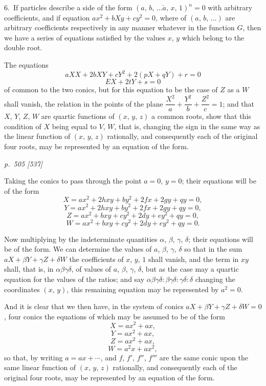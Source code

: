 \documentclass[11pt,a4paper]{book}
\begin{document}
\smallskip
\noindent\textsc{6.}\, If particles describe a side of the form $(a,\, b,\, \ldots\check{a},\, x,\, 1)^n = 0$ with arbitrary
coefficients, and if equation $a x^2 + bX y + c y^2 = 0$, where of $(a,\, b,\, \ldots)$ are arbitrary
coefficients respectively in any manner whatever in the function $G$, then we have a
series of equations satisfied by the values $x$, $y$ which belong to the double root.

The equations
\[
aXX + 2bXY + cY^2 + 2(pX + qY) + r = 0
\]
\[
EX + 2tY + s = 0
\]
of common to the two conics, but for this equation to be the case of $Z$ as a $W$ shall vanish, the relation
in the points of the plane $\dfrac{X^2}{a} + \dfrac{Y^2}{b} + \dfrac{Z^2}{c} = 1$; and that
$X$, $Y$, $Z$, $W$ are quartic functions of $(x,\, y,\, z)$ a common roots, show that this
condition of $X$ being equal to $V$, $W$, that is, changing the sign in the same way as the
linear function of $(x,\, y,\, z)$ rationally, and consequently each of the original four roots, may
be represented by an equation of the form.

\clearpage

\bigskip
\textit{p.~505 [537]}
\smallskip

\noindent
Taking the conics to pass through the point $a = 0$, $y = 0$; their equations will be
of the form
\[
X = ax^2 + 2hxy + by^2 + 2fx + 2gy + qy = 0,
\]
\[
Y = ax^2 + 2hxy + by^2 + 2fx + 2gy + qy = 0,
\]
\[
Z = ax^2 + bxy + cy^2 + 2dy + ey^2 + qy = 0,
\]
\[
W = ax^2 + bxy + cy^2 + 2dy + ey^2 + qy = 0.
\]

Now multiplying by the indeterminate quantities $\alpha$, $\beta$, $\gamma$, $\delta$; their equations will be
of the form. We can determine the values of $a$, $\beta$, $\gamma$, $\delta$ so that in the sum $aX + \beta Y + \gamma Z + \delta W$
the coefficients of $x$, $y$, $1$ shall vanish, and the term in $xy$ shall, that is, in $\alpha\beta\gamma\delta$,
of values of $a$, $\beta$, $\gamma$, $\delta$, but as the case may a quartic equation for the values of the ratios; and
say $\alpha\beta\gamma\delta : \beta\gamma\delta : \gamma\delta : \delta$ changing the coordinates $(x,\, y)$, this remaining equation
may be represented by $a^2 = 0$.

And it is clear that we then have, in the system of conics $aX + \beta Y + \gamma Z + \delta W = 0$,
four conics the equations of which may be assumed to be of the form
\[
X = ax^2 + ax,
\]
\[
Y = ax^2 + ax,
\]
\[
Z = a x^2 + ax,
\]
\[
W = a^2x + ax^2,
\]
so that, by writing $a = ax + \cdots$, and $f$, $f'$, $f''$, $f'''$ are the same conic upon
the same linear function of $(x,\, y,\, z)$ rationally, and consequently each of the original four roots, may
be represented by an equation of the form.
\end{document}
